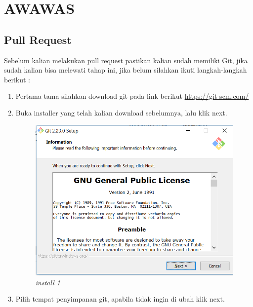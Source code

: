 \chapter{AWAWAS}
\section{Pull Request}
\par Sebelum kalian melakukan pull request pastikan kalian sudah memiliki Git, jika sudah kalian bisa melewati tahap ini, jika belum silahkan ikuti langkah-langkah berikut :

\begin{enumerate}
	\item Pertama-tama silahkan download git pada link berikut \url{https://git-scm.com/}
	\item Buka installer yang telah kalian download sebelumnya, lalu klik next.
	
\begin{figure}[H]
    \centering
    \includegraphics[scale=0.5]{figures/1.png}
    \caption{\textit{install 1}}
    \label{1}
\end{figure}
	
	\item Pilih tempat penyimpanan git, apabila tidak ingin di ubah klik next.


\end{enumerate}
